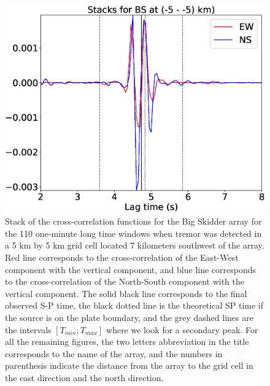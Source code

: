 \documentclass[letterpaper, 12pt]{article}
\begin{document}
\begin{figure}
\includegraphics[width=\linewidth]{figures/intervals/BS_-05_-05_stacks.eps}
\caption{Stack of the cross-correlation functions for the Big Skidder array for the 110 one-minute long time windows when tremor was detected in a 5 km by 5 km grid cell located 7 kilometers southwest of the array. Red line corresponds to the cross-correlation of the East-West component with the vertical component, and blue line corresponds to the cross-correlation of the North-South component with the vertical component. The solid black line corresponds to the final observed S-P time, the black dotted line is the theoretical SP time if the source is on the plate boundary, and the grey dashed lines are the intervals $\left[T_{min} ; T_{max}\right]$ where we look for a secondary peak. For all the remaining figures, the two letters abbreviation in the title corresponds to the name of the array, and the numbers in parenthesis indicate the distance from the array to the grid cell in the east direction and the north direction.}
\end{figure}
\end{document}
